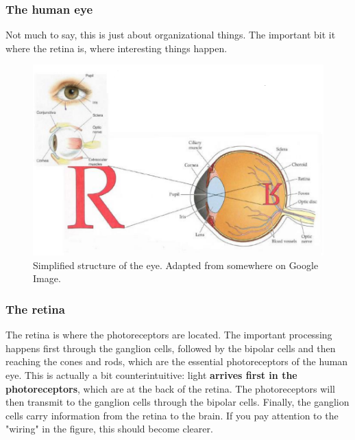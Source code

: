 \subsubsection{The human eye}

Not much to say, this is just about organizational things. The important bit it where the retina is, where interesting things happen.  

\begin{figure}[H]
    \centering
    \includegraphics[width=0.9\linewidth]{../../Figures/Eye.PNG}
    \caption{Simplified structure of the eye. Adapted from somewhere on Google Image.}
    \label{fig:Eye}
\end{figure}

\subsubsection{The retina}

The retina is where the photoreceptors are located. The important processing happens first through the ganglion cells, followed by the bipolar cells and then reaching the cones and rods, which are the essential photoreceptors of the human eye. This is actually a bit counterintuitive: light \textbf{arrives first in the photoreceptors}, which are at the back of the retina. The photoreceptors will then transmit to the ganglion cells through the bipolar cells. Finally, the ganglion cells carry information from the retina to the brain. If you pay attention to the "wiring" in the figure, this should become clearer. 

